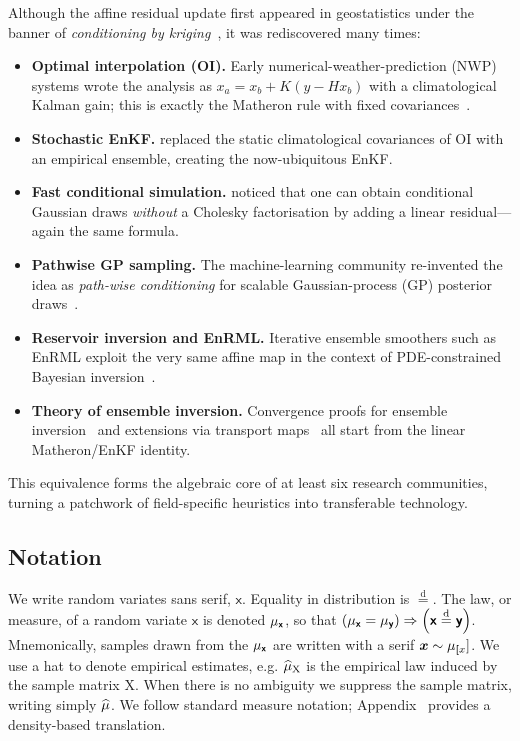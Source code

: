 \documentclass[wcp]{jmlr} %
\newcommand{\vv}[1]{\boldsymbol{#1}}
\newcommand{\mm}[1]{\mathrm{#1}}
\newcommand{\rv}[1]{\mathsf{#1}}
\newcommand{\vrv}[1]{\vv{\rv{#1}}}
\newcommand{\disteq}{\stackrel{\mathrm{d}}{=}}
\begin{document}
Although the affine residual update first appeared in geostatistics under the banner of \emph{conditioning by kriging}~\citep{Chiles2018Fifty}, it was rediscovered many times:
\begin{itemize}
    \item \textbf{Optimal interpolation (OI).}  Early numerical-weather-prediction (NWP) systems wrote the analysis as
    $x_a = x_b + K(y - Hx_b)$ with a climatological Kalman gain; this is exactly the Matheron rule with fixed covariances~\citep{Hunt2007Efficient}.
    \item \textbf{Stochastic EnKF.}  \citet{Evensen2003Ensemble} replaced the static climatological covariances of OI with an empirical ensemble, creating the now-ubiquitous EnKF.
    \item \textbf{Fast conditional simulation.}  \citet{Doucet2010Note} noticed that one can obtain conditional Gaussian draws \emph{without} a Cholesky factorisation by adding a linear residual—again the same formula.
    \item \textbf{Pathwise GP sampling.}  The machine-learning community re-invented the idea as \emph{path-wise conditioning} for scalable Gaussian-process (GP) posterior draws~\citep{Wilson2020Efficiently,Wilson2021Pathwise,Borovitskiy2023Matern}.
    \item \textbf{Reservoir inversion and EnRML.}  Iterative ensemble smoothers such as EnRML exploit the very same affine map in the context of PDE-constrained Bayesian inversion~\citep{Chen2012Ensemble}.
    \item \textbf{Theory of ensemble inversion.}  Convergence proofs for ensemble inversion~\citep{Schillings2017Analysis} and extensions via transport maps~\citep{Spantini2022Coupling} all start from the linear Matheron/EnKF identity.
\end{itemize}

This equivalence forms the algebraic core of at least six research communities, turning a patchwork of field-specific heuristics into transferable technology.

\subsection{Notation}

We write random variates sans serif, $\vrv{x}$.
Equality in distribution is $\disteq$.
The law, or measure, of a random variate $\vrv{x}$ is denoted $\Law[\vrv{x}]$,
so that $\left(\Law[\vrv{x}]=\Law[\vrv{y}]\right) \Rightarrow \left(\vrv{x}\disteq\vrv{y}\right)$.
Mnemonically, samples drawn from the $\Law[\vrv{x}]$ are written with a serif $\vv{x}\sim\Law[\vrv[x]]$.
We use a hat to denote empirical estimates, e.g. \(\ELaw[\mm{X}]\) is the empirical law induced by the sample matrix \(\mm{X}\).
When there is no ambiguity we suppress the sample matrix, writing simply \(\widehat{\Law}\).
We follow standard measure notation; Appendix~ provides a density-based translation.
\end{document}
